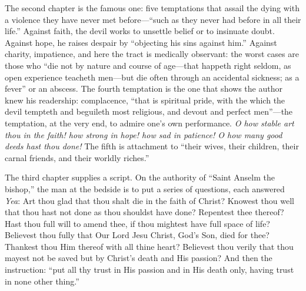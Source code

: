 The second chapter is the famous one: five temptations that assail the dying with a violence they have never met before---``such as they never had before in all their life.'' Against faith, the devil works to unsettle belief or to insinuate doubt. Against hope, he raises despair by ``objecting his sins against him.'' Against charity, impatience, and here the tract is medically observant: the worst cases are those who ``die not by nature and course of age---that happeth right seldom, as open experience teacheth men---but die often through an accidental sickness; as a fever'' or an abscess. The fourth temptation is the one that shows the author knew his readership: complacence, ``that is spiritual pride, with the which the devil tempteth and beguileth most religious, and devout and perfect men''---the temptation, at the very end, to admire one's own performance. \emph{O how stable art thou in the faith! how strong in hope! how sad in patience! O how many good deeds hast thou done!} The fifth is attachment to ``their wives, their children, their carnal friends, and their worldly riches.''

The third chapter supplies a script. On the authority of ``Saint Anselm the bishop,'' the man at the bedside is to put a series of questions, each answered \emph{Yea}: Art thou glad that thou shalt die in the faith of Christ? Knowest thou well that thou hast not done as thou shouldst have done? Repentest thee thereof? Hast thou full will to amend thee, if thou mightest have full space of life? Believest thou fully that Our Lord Jesu Christ, God's Son, died for thee? Thankest thou Him thereof with all thine heart? Believest thou verily that thou mayest not be saved but by Christ's death and His passion? And then the instruction: ``put all thy trust in His passion and in His death only, having trust in none other thing.''

